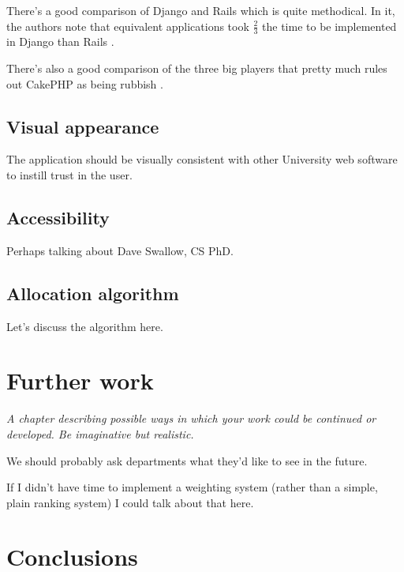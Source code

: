 \documentclass[]{scrartcl}
\begin{document}
There's a good comparison of Django and Rails which is quite methodical. In it, the authors note that equivalent applications took $\frac{2}{3}$ the time to be implemented in Django than Rails \cite{RailsDjangoComparison_2007}.

There's also a good comparison of the three big players that pretty much rules out CakePHP as being rubbish \cite{EvalWebDevFrameworks_2009}.

\subsection{Visual appearance}

The application should be visually consistent with other University web software to instill trust in the user.


\subsection{Accessibility}

Perhaps talking about Dave Swallow, CS PhD.

\subsection{Allocation algorithm}

Let's discuss the algorithm here.

\section{Further work}

\textit{A chapter describing possible ways in which your work could be continued or developed. Be imaginative but realistic.}

We should probably ask departments what they'd like to see in the future.

If I didn't have time to implement a weighting system (rather than a simple, plain ranking system) I could talk about that here.

\section{Conclusions}
\end{document}

